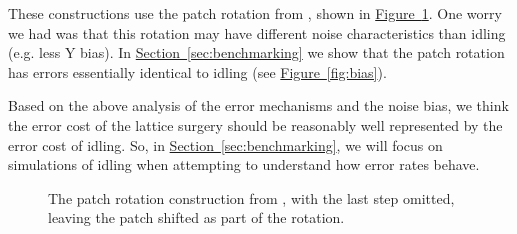 \documentclass[onecolumn,unpublished,a4paper]{quantumarticle}
\theoremstyle{definition}
\theoremstyle{definition}
\theoremstyle{definition}
\renewcommand{\sec}[1]{\hyperref[sec:#1]{Section~\ref*{sec:#1}}}
\newcommand{\fig}[1]{\hyperref[fig:#1]{Figure~\ref*{fig:#1}}}
\begin{document}
These constructions use the patch rotation from \cite{litinski2019gameofsurfacecodes}, shown in \fig{patch_rotation}.
One worry we had was that this rotation may have different noise characteristics than idling (e.g. less Y bias).
In \sec{benchmarking} we show that the patch rotation has errors essentially identical to idling (see \fig{bias}).

Based on the above analysis of the error mechanisms and the noise bias, we think the error cost of the lattice surgery should be reasonably well represented by the error cost of idling.
So, in \sec{benchmarking}, we will focus on simulations of idling when attempting to understand how error rates behave.


\begin{figure}[h]
    \centering
    \caption{
        The patch rotation construction from \cite{litinski2019gameofsurfacecodes}, with the last step omitted, leaving the patch shifted as part of the rotation.
    }
    \label{fig:patch_rotation}
\end{figure}
\end{document}
